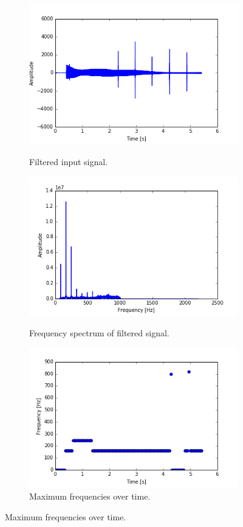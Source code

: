 \begin{figure}[H]
\begin{subfigure}{0.49\textwidth}
\end{subfigure}
\begin{subfigure}{0.49\textwidth}
\centering

\includegraphics[width=\textwidth]{figures/validation/integration/f_signal.png}
\caption{Filtered input signal.}
\label{fig:inte_signal_filt}

\includegraphics[width=\textwidth]{figures/validation/integration/f_FSIGNAL.png}
\caption{Frequency spectrum of filtered signal.}
\label{fig:inte_SIGNAL_filt}

\includegraphics[width=\textwidth]{figures/validation/integration/peak_dec.png}
\caption{Maximum frequencies over time.}
\label{fig:inte_peak}


\end{subfigure}
\end{figure}

